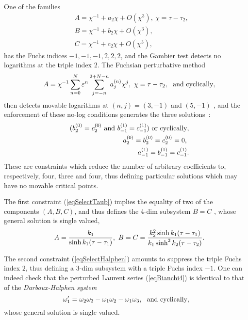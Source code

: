 \documentclass[10pt]{article}
\begin{document}
One of the families \cite{CGR1993,LMC1994}
\begin{eqnarray}
& &
A= \chi^{-1} + a_2 \chi + O(\chi^3),\ \chi=\tau-\tau_2,
\nonumber
\\
& &
B= \chi^{-1} + b_2 \chi + O(\chi^3),
\label{eqLaurentFamilyTwoOrder0}
\\
& &
C= \chi^{-1} + c_2 \chi + O(\chi^3),
\nonumber
\end{eqnarray}
has the Fuchs indices $-1,-1,-1,2,2,2$,
and the Gambier test detects no logarithms at the triple index $2$.
The Fuchsian perturbative method 
\begin{eqnarray}
& &
A=\chi^{-1} \sum_{n=0}^N \varepsilon^n
\sum_{j=-n}^{2+N-n} a_{j}^{(n)} \chi^{j},\
\chi=\tau-\tau_2,\
\hbox{ and cyclically},
\label{eqBianchi4}
\end{eqnarray}
then detects movable logarithms at $(n,j)=(3,-1)$ and $(5,-1)$ \cite{LMC1994},
and the enforcement of these no-log conditions generates the three solutions~:
\begin{eqnarray}
& &
(b_{ 2}^{(0)}=c_{ 2}^{(0)} \hbox{ and } b_{-1}^{(1)}=c_{-1}^{(1)})
\hbox{ or cyclically},
\label{eqSelectTaub}
\\
& &
a_{2}^{(0)}=b_{2}^{(0)}=c_{2}^{(0)}=0,\
\label{eqSelectHalphen}
\\
& &
a_{-1}^{(1)}=b_{-1}^{(1)}=c_{-1}^{(1)}.
\label{eqSelectEuler}
\end{eqnarray}
These are constraints which reduce the number of arbitrary coefficients
to, respectively, four, three and four,
thus defining particular solutions which may have no movable critical points.

The first constraint (\ref{eqSelectTaub})
implies the equality of two of the components $(A,B,C)$,
and thus defines the 4-dim subsystem $B=C$ \cite{Taub},
whose general solution is single valued,
\begin{eqnarray}
& &
A={k_1 \over \sinh k_1 (\tau-\tau_1)},\
B=C={k_2^2 \sinh k_1 (\tau-\tau_1) \over k_1 \sinh^2 k_2 (\tau-\tau_2)}.
\label{eqTaubNoMetric}
\end{eqnarray}

The second constraint (\ref{eqSelectHalphen}) 
amounts to suppress the triple Fuchs index $2$,
thus defining a 3-dim subsystem with a triple Fuchs index $-1$.
One can indeed check that the perturbed Laurent series (\ref{eqBianchi4})
is identical to that of the 
\textit{Darboux-Halphen system} \cite{Darboux1878,Halphen1881}
 \index{Darboux-Halphen system}
\begin{equation}
\omega_1' 
= \omega_2 \omega_3 - \omega_1 \omega_2 - \omega_1 \omega_3,\ 
\hbox{ and cyclically},
\label{eqDarboux}
\end{equation}
whose general solution is single valued.
\end{document}
